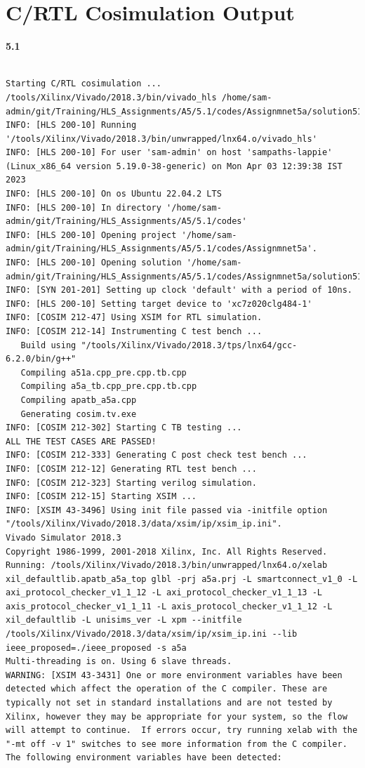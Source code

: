 \documentclass{article}
\begin{document}
\section{C/RTL Cosimulation Output}
\vspace{1cm}
\textbf{5.1}
\begin{lstlisting}

Starting C/RTL cosimulation ...
/tools/Xilinx/Vivado/2018.3/bin/vivado_hls /home/sam-admin/git/Training/HLS_Assignments/A5/5.1/codes/Assignmnet5a/solution51a/cosim.tcl
INFO: [HLS 200-10] Running '/tools/Xilinx/Vivado/2018.3/bin/unwrapped/lnx64.o/vivado_hls'
INFO: [HLS 200-10] For user 'sam-admin' on host 'sampaths-lappie' (Linux_x86_64 version 5.19.0-38-generic) on Mon Apr 03 12:39:38 IST 2023
INFO: [HLS 200-10] On os Ubuntu 22.04.2 LTS
INFO: [HLS 200-10] In directory '/home/sam-admin/git/Training/HLS_Assignments/A5/5.1/codes'
INFO: [HLS 200-10] Opening project '/home/sam-admin/git/Training/HLS_Assignments/A5/5.1/codes/Assignmnet5a'.
INFO: [HLS 200-10] Opening solution '/home/sam-admin/git/Training/HLS_Assignments/A5/5.1/codes/Assignmnet5a/solution51a'.
INFO: [SYN 201-201] Setting up clock 'default' with a period of 10ns.
INFO: [HLS 200-10] Setting target device to 'xc7z020clg484-1'
INFO: [COSIM 212-47] Using XSIM for RTL simulation.
INFO: [COSIM 212-14] Instrumenting C test bench ...
   Build using "/tools/Xilinx/Vivado/2018.3/tps/lnx64/gcc-6.2.0/bin/g++"
   Compiling a51a.cpp_pre.cpp.tb.cpp
   Compiling a5a_tb.cpp_pre.cpp.tb.cpp
   Compiling apatb_a5a.cpp
   Generating cosim.tv.exe
INFO: [COSIM 212-302] Starting C TB testing ... 
ALL THE TEST CASES ARE PASSED!
INFO: [COSIM 212-333] Generating C post check test bench ...
INFO: [COSIM 212-12] Generating RTL test bench ...
INFO: [COSIM 212-323] Starting verilog simulation. 
INFO: [COSIM 212-15] Starting XSIM ...
INFO: [XSIM 43-3496] Using init file passed via -initfile option "/tools/Xilinx/Vivado/2018.3/data/xsim/ip/xsim_ip.ini".
Vivado Simulator 2018.3
Copyright 1986-1999, 2001-2018 Xilinx, Inc. All Rights Reserved.
Running: /tools/Xilinx/Vivado/2018.3/bin/unwrapped/lnx64.o/xelab xil_defaultlib.apatb_a5a_top glbl -prj a5a.prj -L smartconnect_v1_0 -L axi_protocol_checker_v1_1_12 -L axi_protocol_checker_v1_1_13 -L axis_protocol_checker_v1_1_11 -L axis_protocol_checker_v1_1_12 -L xil_defaultlib -L unisims_ver -L xpm --initfile /tools/Xilinx/Vivado/2018.3/data/xsim/ip/xsim_ip.ini --lib ieee_proposed=./ieee_proposed -s a5a 
Multi-threading is on. Using 6 slave threads.
WARNING: [XSIM 43-3431] One or more environment variables have been detected which affect the operation of the C compiler. These are typically not set in standard installations and are not tested by Xilinx, however they may be appropriate for your system, so the flow will attempt to continue.  If errors occur, try running xelab with the "-mt off -v 1" switches to see more information from the C compiler. The following environment variables have been detected:

\end{lstlisting}
\end{document}
